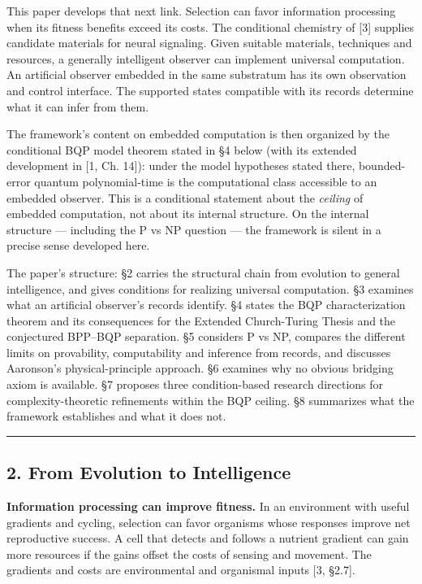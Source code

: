 \documentclass[
]{article}
\begin{document}
This paper develops that next link. Selection can favor information
processing when its fitness benefits exceed its costs. The conditional
chemistry of {[}3{]} supplies candidate materials for neural signaling.
Given suitable materials, techniques and resources, a generally
intelligent observer can implement universal computation. An artificial
observer embedded in the same substratum has its own observation and
control interface. The supported states compatible with its records
determine what it can infer from them.

The framework's content on embedded computation is then organized by the
conditional BQP model theorem stated in §4 below (with its extended
development in {[}1, Ch. 14{]}): under the model hypotheses stated
there, bounded-error quantum polynomial-time is the computational class
accessible to an embedded observer. This is a conditional statement
about the \emph{ceiling} of embedded computation, not about its internal
structure. On the internal structure --- including the P vs NP question
--- the framework is silent in a precise sense developed here.

The paper's structure: §2 carries the structural chain from evolution to
general intelligence, and gives conditions for realizing universal
computation. §3 examines what an artificial observer's records identify.
§4 states the BQP characterization theorem and its consequences for the
Extended Church-Turing Thesis and the conjectured BPP--BQP separation.
§5 considers P vs NP, compares the different limits on provability,
computability and inference from records, and discusses Aaronson's
physical-principle approach. §6 examines why no obvious bridging axiom
is available. §7 proposes three condition-based research directions for
complexity-theoretic refinements within the BQP ceiling. §8 summarizes
what the framework establishes and what it does not.

\begin{center}\rule{0.5\linewidth}{0.5pt}\end{center}

\hypertarget{from-evolution-to-intelligence}{%
\subsection{2. From Evolution to
Intelligence}\label{from-evolution-to-intelligence}}

\textbf{Information processing can improve fitness.} In an environment
with useful gradients and cycling, selection can favor organisms whose
responses improve net reproductive success. A cell that detects and
follows a nutrient gradient can gain more resources if the gains offset
the costs of sensing and movement. The gradients and costs are
environmental and organismal inputs {[}3, §2.7{]}.
\end{document}

